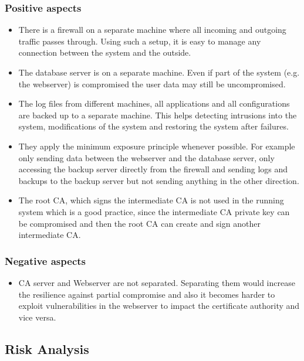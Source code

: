 \documentclass[english]{article}
\begin{document}
\subsubsection{Positive aspects}
\begin{itemize}
\item There is a firewall on a separate machine where all incoming and outgoing traffic passes through. Using such a setup, it is easy to manage any connection between the system and the outside.
\item The database server is on a separate machine. Even if part of the system (e.g. the webserver) is compromised the user data may still be uncompromised.
\item The log files from different machines, all applications and all configurations are backed up to a separate machine. This helps detecting intrusions into the system, modifications of the system and restoring the system after failures.
\item They apply the minimum exposure principle whenever possible. For example only sending data between the webserver and the database server, only accessing the backup server directly from the firewall and sending logs and backups to the backup server but not sending anything in the other direction.
\item The root CA, which signs the intermediate CA is not used in the running system which is a good practice, since the intermediate CA private key can be compromised and then the root CA can create and sign another intermediate CA.
  
\end{itemize}

\subsubsection{Negative aspects}
\begin{itemize}
\item CA server and Webserver are not separated. Separating them would increase the resilience against partial compromise and also it becomes harder to exploit vulnerabilities in the webserver to impact the certificate authority and vice versa.
\end{itemize}

\subsection{Risk Analysis} %
\end{document}
